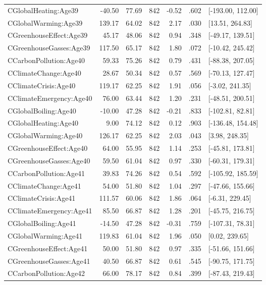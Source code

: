 \begin{table}[ht]
\begin{tabular}{lrrrrrl}
  CGlobalHeating:Age39 & -40.50 & 77.69 & 842 & -0.52 & .602 & [-193.00, 112.00] \\ 
  CGlobalWarming:Age39 & 139.17 & 64.02 & 842 & 2.17 & .030 & [13.51, 264.83] \\ 
  CGreenhouseEffect:Age39 & 45.17 & 48.06 & 842 & 0.94 & .348 & [-49.17, 139.51] \\ 
  CGreenhouseGasses:Age39 & 117.50 & 65.17 & 842 & 1.80 & .072 & [-10.42, 245.42] \\ 
  CCarbonPollution:Age40 & 59.33 & 75.26 & 842 & 0.79 & .431 & [-88.38, 207.05] \\ 
  CClimateChange:Age40 & 28.67 & 50.34 & 842 & 0.57 & .569 & [-70.13, 127.47] \\ 
  CClimateCrisis:Age40 & 119.17 & 62.25 & 842 & 1.91 & .056 & [-3.02, 241.35] \\ 
  CClimateEmergency:Age40 & 76.00 & 63.44 & 842 & 1.20 & .231 & [-48.51, 200.51] \\ 
  CGlobalBoiling:Age40 & -10.00 & 47.28 & 842 & -0.21 & .833 & [-102.81, 82.81] \\ 
  CGlobalHeating:Age40 & 9.00 & 74.12 & 842 & 0.12 & .903 & [-136.48, 154.48] \\ 
  CGlobalWarming:Age40 & 126.17 & 62.25 & 842 & 2.03 & .043 & [3.98, 248.35] \\ 
  CGreenhouseEffect:Age40 & 64.00 & 55.95 & 842 & 1.14 & .253 & [-45.81, 173.81] \\ 
  CGreenhouseGasses:Age40 & 59.50 & 61.04 & 842 & 0.97 & .330 & [-60.31, 179.31] \\ 
  CCarbonPollution:Age41 & 39.83 & 74.26 & 842 & 0.54 & .592 & [-105.92, 185.59] \\ 
  CClimateChange:Age41 & 54.00 & 51.80 & 842 & 1.04 & .297 & [-47.66, 155.66] \\ 
  CClimateCrisis:Age41 & 111.57 & 60.06 & 842 & 1.86 & .064 & [-6.31, 229.45] \\ 
  CClimateEmergency:Age41 & 85.50 & 66.87 & 842 & 1.28 & .201 & [-45.75, 216.75] \\ 
  CGlobalBoiling:Age41 & -14.50 & 47.28 & 842 & -0.31 & .759 & [-107.31, 78.31] \\ 
  CGlobalWarming:Age41 & 119.83 & 61.04 & 842 & 1.96 & .050 & [0.02, 239.65] \\ 
  CGreenhouseEffect:Age41 & 50.00 & 51.80 & 842 & 0.97 & .335 & [-51.66, 151.66] \\ 
  CGreenhouseGasses:Age41 & 40.50 & 66.87 & 842 & 0.61 & .545 & [-90.75, 171.75] \\ 
  CCarbonPollution:Age42 & 66.00 & 78.17 & 842 & 0.84 & .399 & [-87.43, 219.43] \\ 

\end{tabular}
\end{table}
